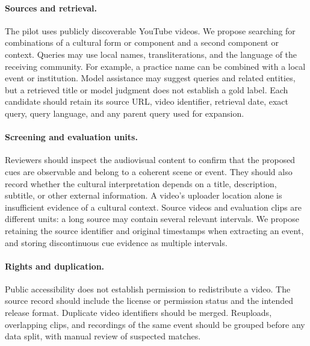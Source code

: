 \paragraph{Sources and retrieval.}
The pilot uses publicly discoverable YouTube videos. We propose searching
for combinations of a cultural form or component and a second component
or context. Queries may use local names, transliterations, and the
language of the receiving community. For example, a practice name can be
combined with a local event or institution. Model assistance may suggest
queries and related entities, but a retrieved title or model judgment
does not establish a gold label. Each candidate should retain its source
URL, video identifier, retrieval date, exact query, query language, and
any parent query used for expansion.

\paragraph{Screening and evaluation units.}
Reviewers should inspect the audiovisual content to confirm that the
proposed cues are observable and belong to a coherent scene or event. They should
also record whether the cultural interpretation depends on a title,
description, subtitle, or other external information. A video's uploader
location alone is insufficient evidence of a cultural context. Source
videos and evaluation clips are different units: a long source may
contain several relevant intervals. We propose retaining the source
identifier and original timestamps when extracting an event, and storing
discontinuous cue evidence as multiple intervals.

\paragraph{Rights and duplication.}
Public accessibility does not establish permission to redistribute a
video. The source record should include the license or permission status
and the intended release format. Duplicate video identifiers should be
merged. Reuploads, overlapping clips, and recordings of the same event
should be grouped before any data split, with manual review of suspected
matches.


